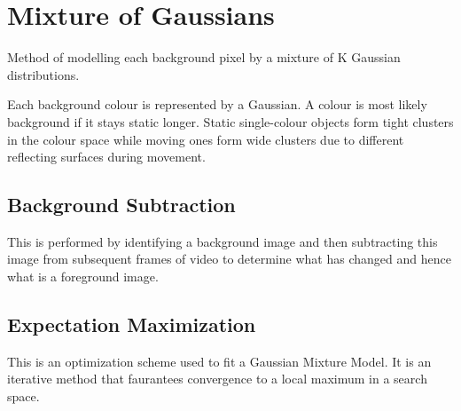 \section{Mixture of Gaussians}

Method of modelling each background pixel by a mixture of K Gaussian distributions. 

Each background colour is represented by a Gaussian. A colour is most likely background if it stays static longer. Static single-colour objects form tight clusters in the colour space while moving ones form wide clusters due to different reflecting surfaces during movement. 

\subsection{Background Subtraction}

This is performed by identifying a background image and then subtracting this image from subsequent frames of video to determine what has changed and hence what is a foreground image.

\subsection{Expectation Maximization}

This is an optimization scheme used to fit a Gaussian Mixture Model. It is an iterative method that faurantees convergence to a local maximum in a search space.